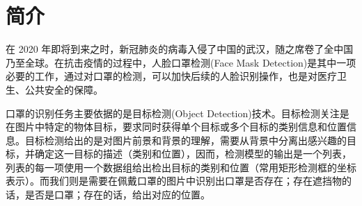 \documentclass[journal,transmag]{IEEEtran}
\begin{document}
\maketitle


\IEEEdisplaynontitleabstractindextext







%
\IEEEpeerreviewmaketitle



\section{简介}
% 
% 
% 
% 
在 2020 年即将到来之时，新冠肺炎的病毒入侵了中国的武汉，随之席卷了全中国乃至全球。在抗击疫情的过程中，人脸口罩检测(Face Mask Detection)是其中一项必要的工作，通过对口罩的检测，可以加快后续的人脸识别操作，也是对医疗卫生、公共安全的保障。

口罩的识别任务主要依据的是目标检测(Object Detection)技术。目标检测关注是在图片中特定的物体目标，要求同时获得单个目标或多个目标的类别信息和位置信息。目标检测给出的是对图片前景和背景的理解，需要从背景中分离出感兴趣的目标，并确定这一目标的描述（类别和位置），因而，检测模型的输出是一个列表，列表的每一项使用一个数据组给出检出目标的类别和位置（常用矩形检测框的坐标表示）。而我们则是需要在佩戴口罩的图片中识别出口罩是否存在；存在遮挡物的话，是否是口罩；存在的话，给出对应的位置。
\end{document}
